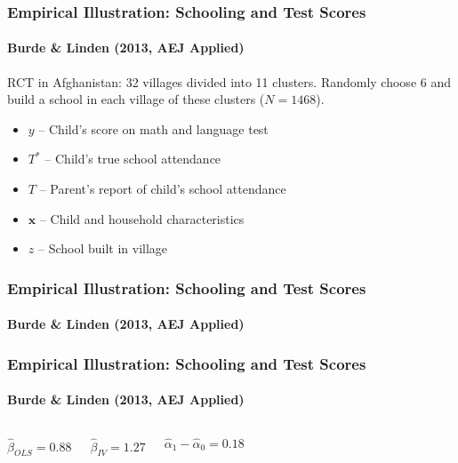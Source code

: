 \documentclass{beamer}
\begin{document}
\begin{frame}
  \frametitle{Empirical Illustration: Schooling and Test Scores}
\framesubtitle{Burde \& Linden (2013, AEJ Applied)}
  RCT in Afghanistan: 32 villages divided into 11 clusters. Randomly choose 6 and build a school in each village of these clusters ($N = 1468$).

\begin{itemize}
  \item $y$ -- Child's score on math and language test 
  \item $T^*$ -- Child's true school attendance
  \item $T$ -- Parent's report of child's school attendance
  \item $\mathbf{x}$ -- Child and household characteristics
  \item $z$ -- School built in village
\end{itemize}
\end{frame}
\begin{frame}
  \frametitle{Empirical Illustration: Schooling and Test Scores}
\framesubtitle{Burde \& Linden (2013, AEJ Applied)}
\begin{figure}[h]
  \scriptsize
  \begingroup
  \centering
  
  \endgroup
\end{figure}
\end{frame}
\begin{frame}
  \frametitle{Empirical Illustration: Schooling and Test Scores}
\framesubtitle{Burde \& Linden (2013, AEJ Applied)}
    \begin{columns}[c]
    $\widehat{\beta}_{OLS} = 0.88$

    $\widehat{\beta}_{IV} = 1.27$

    $\widehat{\alpha}_1 - \widehat{\alpha}_0 = 0.18$
        \begin{figure}[h]
          \scriptsize
          \begingroup
          \centering
          
          \endgroup
        \end{figure}
    \end{columns}
\end{frame}
\end{document}
